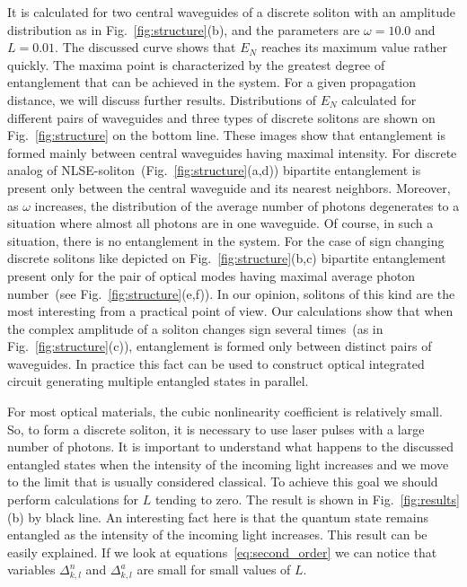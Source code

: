 \documentclass{osa-article}
\begin{document}
It is calculated for two central waveguides of a discrete soliton with an amplitude distribution as in Fig.~\ref{fig:structure}(b), and the parameters are $\omega=10.0$ and $L=0.01$.
The discussed curve shows that $ E_N $ reaches its maximum value rather quickly. The maxima point is characterized by the greatest degree of entanglement that can be achieved in the system. 
For a given propagation distance, we will discuss further results.
Distributions of $E_N$ calculated for different pairs of waveguides and three types of discrete solitons are shown on Fig.~\ref{fig:structure} on the bottom line.
These images show that entanglement is formed mainly between central waveguides having maximal intensity.
For discrete analog of NLSE-soliton~(Fig.~\ref{fig:structure}(a,d)) bipartite entanglement is present only between the central waveguide and its nearest neighbors.
Moreover, as $\omega$ increases, the distribution of the average number of photons degenerates to a situation where almost all photons are in one waveguide. 
Of course, in such a situation, there is no entanglement in the system.
For the case of sign changing discrete solitons like depicted on Fig.~\ref{fig:structure}(b,c) bipartite entanglement present only for the pair of optical modes having maximal average photon number~(see Fig.~\ref{fig:structure}(e,f)). 
In our opinion, solitons of this kind are the most interesting from a practical point of view.
Our calculations show that when the complex amplitude of a soliton changes sign several times~(as in Fig.~\ref{fig:structure}(c)), entanglement is formed only between distinct pairs of waveguides.
In practice this fact can be used to construct optical integrated circuit generating multiple entangled states in parallel.
\par
For most optical materials, the cubic nonlinearity coefficient is relatively small. 
So, to form a discrete soliton, it is necessary to use laser pulses with a large number of photons.
It is important to understand what happens to the discussed entangled states when the intensity of the incoming light increases and we move to the limit that is usually considered classical.
To achieve this goal we should perform calculations for $L$ tending to zero.
The result is shown in Fig.~\ref{fig:results}(b) by black line. 
An interesting fact here is that the quantum state remains entangled as the intensity of the incoming light increases.
This result can be easily explained.
If we look at equations~\eqref{eq:second_order} we can notice that  variables $\Delta^{n}_{k,l}$ and $\Delta^{a}_{k,l}$ are small for small values of $L$.
\end{document}

